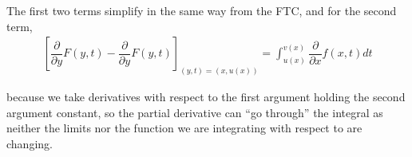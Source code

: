 \documentclass{article}
\begin{document}
\begin{enumerate}[1.]
    The first two terms simplify in the same way from the FTC, and for the second term,
    \begin{align*}
      \left[
        \dfrac{\partial}{\partial y}
        F(y, t)
        -
        \dfrac{\partial}{\partial y}
        F(y, t)
      \right]_{(y, t) = (x, u(x))}
      =
      \int_{u(x)}^{v(x)} 
      \dfrac{\partial}{\partial x} f(x, t) dt
    \end{align*}

    because we take derivatives with respect to the first argument holding the second argument constant, so the partial derivative can ``go through'' the integral as neither the limits nor the function we are integrating with respect to are changing.
\end{enumerate}

\end{document}
